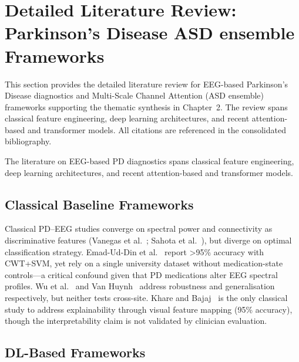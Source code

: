 
\section{Detailed Literature Review: Parkinson's Disease ASD ensemble Frameworks}
\label{app:ch2_pd}
\label{sec:topic2_pd}

This section provides the detailed literature review for EEG-based Parkinson's Disease  diagnostics and Multi-Scale Channel Attention (ASD ensemble) frameworks supporting the thematic synthesis in Chapter~2. The review spans classical feature engineering, deep learning architectures, and recent attention-based and transformer models. All citations are referenced in the consolidated bibliography.

The literature on EEG-based PD diagnostics spans classical feature engineering, deep learning architectures, and recent attention-based and transformer models.

\subsection{Classical Baseline Frameworks}

Classical PD--EEG studies converge on spectral power and connectivity as discriminative features (Vanegas et al.~\cite{vanegas2018pd}; Sahota et al.~\cite{sahota2024pd}), but diverge on optimal classification strategy. Emad-Ud-Din et al.~\cite{emaduddin2025pd} report >95\% accuracy with CWT+SVM, yet rely on a single university dataset without medication-state controls---a critical confound given that PD medications alter EEG spectral profiles. Wu et al.~\cite{wu2023pdeeg} and Van Huynh~\cite{vanhuynh2023ensemble} address robustness and generalisation respectively, but neither tests cross-site. Khare and Bajaj~\cite{khare2021cacdss} is the only classical study to address explainability through visual feature mapping (95\% accuracy), though the interpretability claim is not validated by clinician evaluation.

\subsection{DL-Based Frameworks}

